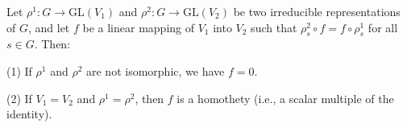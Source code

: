 Let $\rho^1: G \to \text{GL}(V_1)$ and $\rho^2: G \to \text{GL}(V_2)$ be two irreducible representations of $G$, and let $f$ be a linear mapping of $V_1$ into $V_2$ such that $\rho_s^2 \circ f = f \circ \rho_s^1$ for all $s \in G$. Then:

(1) If $\rho^1$ and $\rho^2$ are not isomorphic, we have $f = 0$.

(2) If $V_1 = V_2$ and $\rho^1 = \rho^2$, then $f$ is a homothety (i.e., a scalar multiple of the identity).
